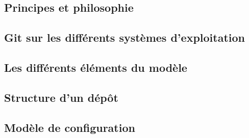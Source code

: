\subsection{Principes et philosophie} %


\subsection{Git sur les différents systèmes d'exploitation}\label{GitOS} %

\subsection{Les différents éléments du modèle} %



\subsection{Structure d'un dépôt} %

\subsection{Modèle de configuration} %
